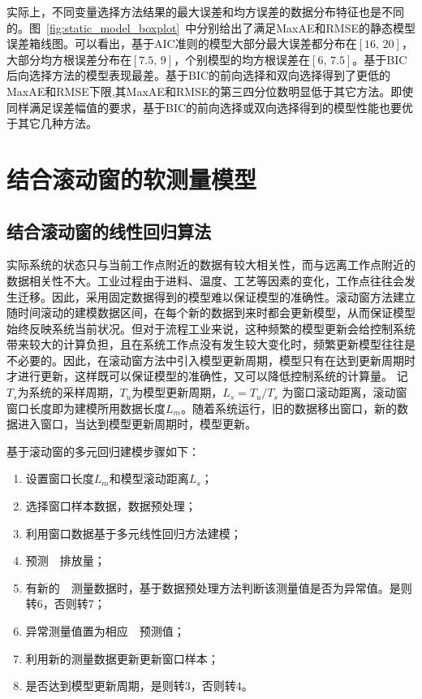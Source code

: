 实际上，不同变量选择方法结果的最大误差和均方误差的数据分布特征也是不同的。图~\ref{fig:static_model_boxplot}~中分别给出了满足MaxAE和RMSE的静态模型误差箱线图。可以看出，基于AIC准则的模型大部分最大误差都分布在$[\textrm{16},\,\textrm{20}]$，大部分均方根误差分布在$[\textrm{7.5},\,\textrm{9}]$，个别模型的均方根误差在$[\textrm{6},\,\textrm{7.5}]$。基于BIC后向选择方法的模型表现最差。基于BIC的前向选择和双向选择得到了更低的MaxAE和RMSE下限,其MaxAE和RMSE的第三四分位数明显低于其它方法。即使同样满足误差幅值的要求，基于BIC的前向选择或双向选择得到的模型性能也要优于其它几种方法。

\section{结合滚动窗的软测量模型}
\subsection{结合滚动窗的线性回归算法}

实际系统的状态只与当前工作点附近的数据有较大相关性，而与远离工作点附近的数据相关性不大。工业过程由于进料、温度、工艺等因素的变化，工作点往往会发生迁移。因此，采用固定数据得到的模型难以保证模型的准确性。滚动窗方法建立随时间滚动的建模数据区间，在每个新的数据到来时都会更新模型，从而保证模型始终反映系统当前状况。但对于流程工业来说，这种频繁的模型更新会给控制系统带来较大的计算负担，且在系统工作点没有发生较大变化时，频繁更新模型往往是不必要的。因此，在滚动窗方法中引入模型更新周期，模型只有在达到更新周期时才进行更新，这样既可以保证模型的准确性，又可以降低控制系统的计算量。
记$T_{s}$为系统的采样周期，$T_{u}$为模型更新周期，$L_{s} = T_{u}/T_{s}$ 为窗口滚动距离，滚动窗窗口长度即为建模所用数据长度$L_{m}$。随着系统运行，旧的数据移出窗口，新的数据进入窗口，当达到模型更新周期时，模型更新。

基于滚动窗的多元回归建模步骤如下：
\begin{enumerate}
\item {设置窗口长度$L_{m}$和模型滚动距离$L_{s}$；} 
\item {选择窗口样本数据，数据预处理；}
\item {利用窗口数据基于多元线性回归方法建模；}
\item{预测~~排放量；}
\item{有新的~~测量数据时，基于数据预处理方法判断该测量值是否为异常值。是则转6，否则转7；}
\item{异常测量值置为相应~~预测值；}
\item{利用新的测量数据更新更新窗口样本；}
\item {是否达到模型更新周期，是则转3，否则转4。}
\end{enumerate}

